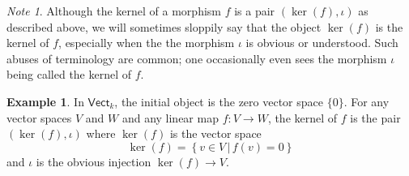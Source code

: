 \documentclass[a4paper,10pt]{scrreprt}
\theoremstyle{definition}
\newtheorem{example}{Example}[section]
\theoremstyle{plain}
\theoremstyle{remark}
\newtheorem{note}{Note}[section]
\begin{document}
\begin{note}
  Although the kernel of a morphism $f$ is a pair $(\ker(f), \iota)$ as described above, we will sometimes sloppily say that the object $\ker(f)$ is the kernel of $f$, especially when the the morphism $\iota$ is obvious or understood. Such abuses of terminology are common; one occasionally even sees the morphism $\iota$ being called the kernel of $f$.
\end{note} 

\begin{example}
  In $\mathsf{Vect}_{k}$, the initial object is the zero vector space $\{0\}$. For any vector spaces $V$ and $W$ and any linear map $f\colon V \to W$, the kernel of $f$ is the pair $(\ker(f), \iota)$ where $\ker(f)$ is the vector space  
  \begin{equation*}
    \ker(f) = \left\{ v \in V \,\big|\, f(v) = 0 \right\}
  \end{equation*}
  and $\iota$ is the obvious injection $\ker(f) \to V$.
\end{example}
\end{document}
